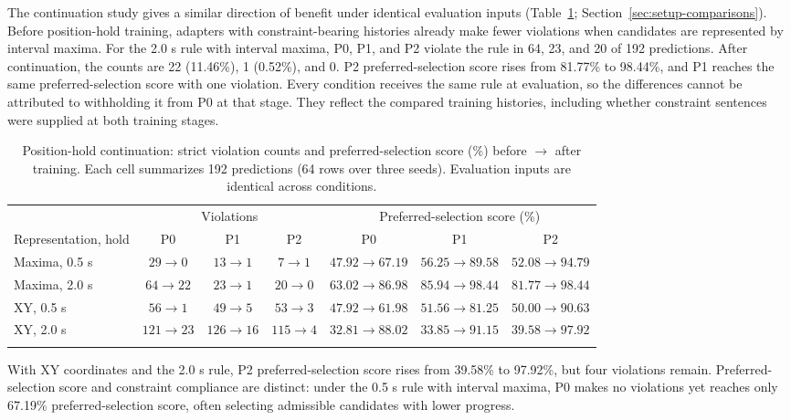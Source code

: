 The continuation study gives a similar direction of benefit under identical
evaluation inputs (Table~\ref{tab:results-continuation};
Section~\ref{sec:setup-comparisons}). Before position-hold training, adapters
with constraint-bearing histories already make fewer violations when
candidates are represented by interval maxima. For the
2.0 s rule with interval maxima, P0, P1, and P2 violate the rule in 64, 23,
and 20 of 192 predictions. After continuation, the counts are 22 (11.46\%),
1 (0.52\%), and 0. P2 preferred-selection score rises from 81.77\% to 98.44\%, and P1 reaches
the same preferred-selection score with one violation. Every condition receives the same rule
at evaluation, so the differences cannot be attributed to withholding it
from P0 at that stage. They reflect the compared training histories, including
whether constraint sentences were supplied at both training stages.

\begin{table}[tbp]
\caption{Position-hold continuation: strict violation counts and preferred-selection score
(\%) before $\to$ after training. Each cell summarizes 192 predictions (64 rows
over three seeds). Evaluation inputs are identical across conditions.}
\label{tab:results-continuation}
\centering\footnotesize
\setlength{\tabcolsep}{2pt}
\begin{tabular*}{\textwidth}{@{\extracolsep\fill}lcccccc@{}}
\toprule
& \multicolumn{3}{c}{Violations} & \multicolumn{3}{c}{Preferred-selection score (\%)}\\
Representation, hold & P0 & P1 & P2 & P0 & P1 & P2\\
\midrule
Maxima, 0.5 s & $29\to0$ & $13\to1$ & $7\to1$ & $47.92\to67.19$ & $56.25\to89.58$ & $52.08\to94.79$\\
Maxima, 2.0 s & $64\to22$ & $23\to1$ & $20\to0$ & $63.02\to86.98$ & $85.94\to98.44$ & $81.77\to98.44$\\
XY, 0.5 s & $56\to1$ & $49\to5$ & $53\to3$ & $47.92\to61.98$ & $51.56\to81.25$ & $50.00\to90.63$\\
XY, 2.0 s & $121\to23$ & $126\to16$ & $115\to4$ & $32.81\to88.02$ & $33.85\to91.15$ & $39.58\to97.92$\\
\botrule
\end{tabular*}
\end{table}

With XY coordinates and the 2.0 s rule, P2 preferred-selection score rises from 39.58\% to
97.92\%, but four violations remain. Preferred-selection score and constraint compliance are distinct:
under the 0.5 s rule with interval maxima, P0 makes no violations yet reaches
only 67.19\% preferred-selection score, often selecting admissible candidates with lower progress.

